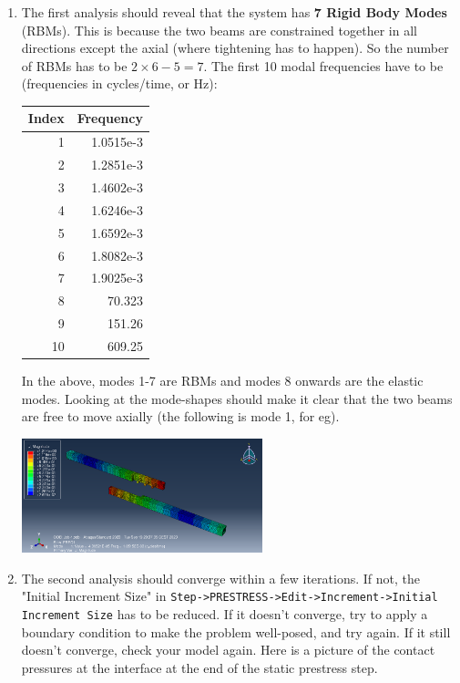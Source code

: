 \documentclass[11pt]{article}
\begin{document}
\begin{enumerate}
\item The first analysis should reveal that the system has \textbf{7 Rigid Body Modes} (RBMs).
This is because the two beams are  constrained together in all directions except the axial (where tightening has to happen).
So the number of RBMs has to be \(2\times 6 - 5 = 7\).
The first 10 modal frequencies have to be (frequencies in cycles/time, or Hz):
\begin{center}
\begin{tabular}{rr}
Index & Frequency\\[0pt]
\hline
1 & 1.0515e-3\\[0pt]
2 & 1.2851e-3\\[0pt]
3 & 1.4602e-3\\[0pt]
4 & 1.6246e-3\\[0pt]
5 & 1.6592e-3\\[0pt]
6 & 1.8082e-3\\[0pt]
7 & 1.9025e-3\\[0pt]
8 & 70.323\\[0pt]
9 & 151.26\\[0pt]
10 & 609.25\\[0pt]
\end{tabular}
\end{center}
In the above, modes 1-7 are RBMs and modes 8 onwards are the elastic modes.
Looking at the mode-shapes should make it clear that the two beams are free to move axially (the following is mode 1, for eg).
\begin{center}
\includegraphics[width=0.55\textwidth]{./figs/res1.png}
\end{center}
\item The second analysis should converge within a few iterations.
If not, the "Initial Increment Size" in \texttt{Step->PRESTRESS->Edit->Increment->Initial Increment Size} has to be reduced.
If it doesn't converge, try to apply a boundary condition to make the problem well-posed, and try again.
If it still doesn't converge, check your model again.
Here is a picture of the contact pressures at the interface at the end of the static prestress step.
\begin{center}

\end{center}
\end{enumerate}
\end{document}
